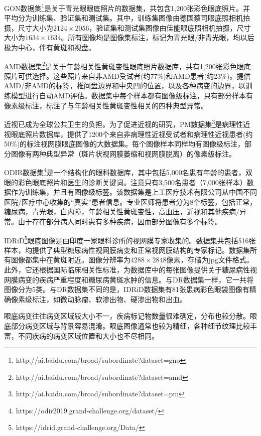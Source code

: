 GON数据集\footnote{http://ai.baidu.com/broad/subordinate?dataset=gno}是关于青光眼眼底照片的数据集，共包含1,200张彩色眼底照片。并平均分为训练集、验证集和测试集。其中，训练集图像由德国蔡司眼底照相机拍摄，尺寸大小为$2124\times 2056$，验证集和测试集图像由佳能眼底照相机拍摄，尺寸大小为$1634\times 1634 $。所有图像均是图像集标注，标记为青光眼/非青光眼，均以后极为中心，伴有黄斑和视盘。

AMD数据集\footnote{http://ai.baidu.com/broad/subordinate?dataset=amd}是关于年龄相关性黄斑变性眼底照片数据库，共有1,200张彩色眼底照片可供选择。这些照片来自非AMD受试者(约77\%)和AMD患者(约23\%)。提供AMD/非AMD的标签，椎间盘边界和中央凹的位置，以及各种病变的边界，以训练模型进行自动AMD评估。数据集中每个样本都有图像级标注，只有部分样本有像素级标注，标注了与年龄相关性黄斑变性相关的四种典型异常。

近视已成为全球公共卫生的负担。为了促进近视的研究，PM数据集\footnote{http://ai.baidu.com/broad/subordinate?dataset=pm}是病理性近视眼底照片数据库，提供了1200个来自非病理性近视受试者和病理性近视患者(约50\%)的标注视网膜眼底图像的大数据集。每个图像样本同样均有图像级标注，部分图像有两种典型异常（斑片状视网膜萎缩和视网膜脱离）的像素级标注。

ODIR数据集\footnote{https://odir2019.grand-challenge.org/dataset/}是一个结构化的眼科数据库，其中包括5,000名患有年龄的患者，双眼的彩色眼底照片和医生的诊断关键词。注意只有3,500名患者（7,000张样本）数据作为训练集，并且有图像级标签。该数据集是上工医疗技术有限公司从中国不同医院/医疗中心收集的“真实”患者信息。专业医师将患者分为8个标签，包括正常，糖尿病，青光眼，白内障，年龄相关性黄斑变性，高血压，近视和其他疾病/异常。由于存在部分病人同时患有多种疾病，因而部分图像有多个标签。

IDRiD\footnote{https://idrid.grand-challenge.org/Data/}眼底图像是由印度一家眼科诊所的视网膜专家收集的。数据集共包括516张样本，均提供了典型糖尿病性视网膜病变和正常视网膜结构的专家标记。数据集所有图像都集中在黄斑附近。图像分辨率为$4288\times 2848$像素，存储为jpg文件格式。此外，它还根据国际临床相关性标准，为数据库中的每张图像提供关于糖尿病性视网膜病变的疾病严重程度和糖尿病黄斑水肿的信息。与DR数据集一样，它一共将图像分为5类。与DR数据集不同的是，IDRiD数据集有81张患病彩色眼袋图像有精确像素级标注，如微动脉瘤、软渗出物、硬渗出物和出血。

眼底病变往往病变区域较大小不一，疾病标记物数量很难确定，分布也较分散。眼底部分病变区域与背景容易混淆。眼底图像通常也较为精细，各种细节纹理比较丰富，不同疾病的病变区域位置和大小也不尽相同。

